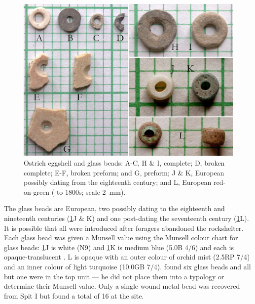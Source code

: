  	\begin{figure} %
 		\includegraphics[width=\linewidth]{figures/Forssman-Figure10}
 		\caption{Ostrich eggshell and glass beads: A-C, H \& I, complete; D, broken complete; E-F, broken preform; and G, preform; J \& K, European possibly dating from the eighteenth century; and L, European red-on-green ( to 1800s; scale \SI{2}{\milli\meter}).}
 		\label{fig:Forssman-Figure10}
 	\end{figure}
 
 
 The glass beads are European, two possibly dating to the eighteenth and nineteenth centuries (\cref{fig:Forssman-Figure10}J \& K) 
 and one post-dating the seventeenth century (\cref{fig:Forssman-Figure10}L). 
 It is possible that all were introduced after foragers abandoned the rockshelter. 
 Each glass bead was given a Munsell value using the Munsell colour chart for glass beads: 
 \cref{fig:Forssman-Figure10}J is white (N9) and \cref{fig:Forssman-Figure10}K is medium blue (5.0B 4/6) 
 and each is opaque-translucent 
 \parencite[slight glow of light along edges;][70]{Wood_2011}. 
 L is opaque with an outer colour of orchid mist (2.5RP 7/4) and an inner colour of light turquoise (10.0GB 7/4).  
 \textcite{Walker_1994} found six glass beads and all but one were in the top unit --– he did not place them into a typology or determine their Munsell value. 
 Only a single wound metal bead was recovered from Spit I but \textcite{Walker_1994} found a total of 16 at the site.


